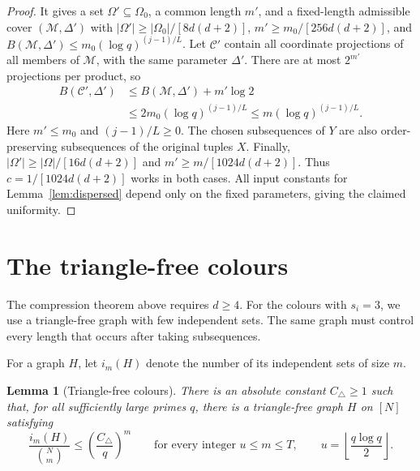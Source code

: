 \documentclass[11pt,a4paper]{article}
\numberwithin{equation}{section}
\newtheorem{lemma}[theorem]{Lemma}
\newcommand{\cC}{\mathcal C}
\begin{document}
\begin{proof}
It gives a set $\Omega'\subseteq\Omega_0$, a common length
$m'$, and a fixed-length admissible cover $(\mathcal M,\Delta')$
with
$|\Omega'|\ge|\Omega_0|/[8d(d+2)]$,
$m'\ge m_0/[256d(d+2)]$, and
$B(\mathcal M,\Delta')\le m_0(\log q)^{(j-1)/L}$.
Let $\cC'$ contain all coordinate projections of all members
of $\mathcal M$, with the same parameter $\Delta'$.
There are at most $2^{m'}$ projections per product, so
\[
 \begin{aligned}
 B(\cC',\Delta')
 &\le B(\mathcal M,\Delta')+m'\log2\\
 &\le2m_0(\log q)^{(j-1)/L}
 \le m(\log q)^{(j-1)/L}.
 \end{aligned}
\]
Here $m'\le m_0$ and $(j-1)/L\ge0$.
The chosen subsequences of $Y$ are also order-preserving
subsequences of the original tuples $X$.
Finally,
$|\Omega'|\ge|\Omega|/[16d(d+2)]$ and $m'\ge m/[1024d(d+2)]$.
Thus $c=1/[1024d(d+2)]$ works in both cases.
All input constants for Lemma~\ref{lem:dispersed} depend only
on the fixed parameters, giving the claimed uniformity.
\end{proof}

\section{The triangle-free colours}\label{sec:triangles}

The compression theorem above requires $d\ge4$.
For the colours with $s_i=3$, we use a triangle-free graph with
few independent sets. The same graph must control every length
that occurs after taking subsequences.

For a graph $H$, let $i_m(H)$ denote the number of its independent
sets of size $m$.

\begin{lemma}[Triangle-free colours]\label{lem:triangles}
There is an absolute constant $C_\triangle\ge1$ such that, for all
sufficiently large primes $q$, there is a triangle-free graph $H$
on $[N]$ satisfying
\begin{equation}\label{eq:triangle-count}
 \frac{i_m(H)}{\binom Nm}\le\left(\frac{C_\triangle}{q}\right)^m
 \qquad\text{for every integer }u\le m\le T,
 \qquad u=\left\lfloor\frac{q\log q}{2}\right\rfloor.
\end{equation}
\end{lemma}
\end{document}
